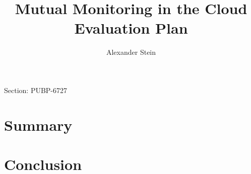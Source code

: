\documentclass{jdf}
\begin{document}
Section: PUBP-6727
\title{Mutual Monitoring in the Cloud \\ Evaluation Plan}
\author{Alexander Stein}

\maketitle
\thispagestyle{fancy}


\section*{Summary}

\section*{Conclusion}
\end{document}
